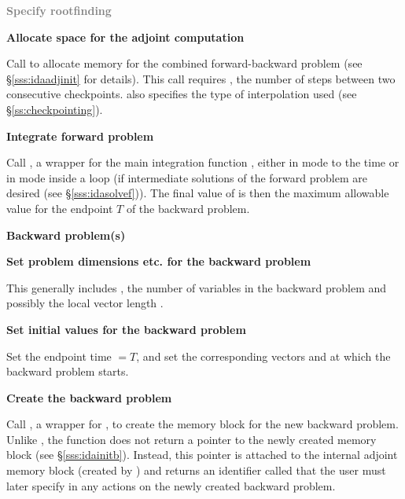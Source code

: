 \begin{Steps}
\item
  \textcolor{gray}{\bf Specify rootfinding}

\item
  {\bf Allocate space for the adjoint computation}

  Call \id{()} to allocate memory for the 
  combined forward-backward problem (see \S\ref{sss:idaadjinit} for details).
  This call requires , the number of steps between two consecutive checkpoints.
   also specifies the type of interpolation used 
  (see \S\ref{ss:checkpointing}).

\item
  {\bf Integrate forward problem}

  Call , a wrapper for the {\idas} main integration
  function , either in  mode to the time 
   or in  mode inside a loop (if intermediate
  solutions of the forward problem are desired (see \S\ref{sss:idasolvef})).
  The final value of  is then the maximum allowable value for
  the endpoint $T$ of the backward problem.

  \vspace{0.2in}\centerline{\bf Backward problem(s)}

 \item \label{i:back_start}
   {\bf Set problem dimensions etc. for the backward problem}
   
   This generally includes , the number of variables in the backward problem
   and possibly the local vector length .

\item
  {\bf Set initial values for the backward problem}

  Set the endpoint time  $= T$, and set the corresponding vectors 
  and  at which the backward problem starts.

\item
  {\bf Create the backward problem}

  Call , a wrapper for , to create the
  {\idas} memory block for the new backward problem. Unlike , 
  the function  does not return a pointer to the newly created 
  memory block (see \S\ref{sss:idainitb}). Instead, this pointer is attached to 
  the internal adjoint memory  block (created by ) and returns an
  identifier called  that the user must later specify in any actions on
  the newly created backward problem.


\end{Steps}
